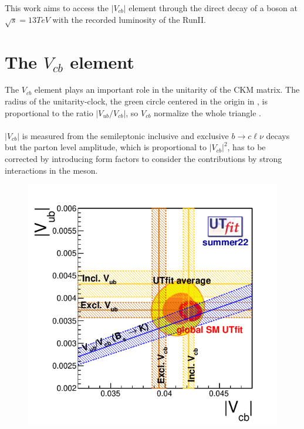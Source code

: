 \label{chap:vcb}
\vspace{-1cm}
\minitoc
This work aims to access the $|V_{cb}|$ element through the direct decay of a \PW boson at $\sqrt{s}=13 TeV$ with the recorded luminosity of the RunII.
\vspace{-0.25cm}
\section{The $V_{cb}$ element}\label{sec:vcb}
\begin{minipage}{\linewidth}
    \begin{minipage}{0.43\linewidth}
    \vspace{-0.3cm}
        The $V_{cb}$ element plays an important role in the unitarity of the CKM matrix. The radius of the unitarity-clock, the green circle centered in the origin in , is proportional to the ratio $|V_{ub}/V_{cb}|$, so $V_{cb}$ normalize the whole triangle \cite{Ricciardi2019DeterminationV_cb}.\\
        \\
        $|V_{cb}|$ is measured from the semileptonic inclusive and exclusive $b \to c\ell\nu$
        decays but the parton level amplitude, which is proportional to $|V_{cb}|^2$, has to be corrected by introducing form factors to consider the contributions by strong interactions in the meson. 
    \end{minipage}
    \hfill
    \begin{minipage}{0.55\linewidth}
        \vspace{-2.175cm}
        \begin{figure}[H]
            \centering
            \includegraphics[width=\linewidth]{fig//chap02-theory/vubvcb.png}

\end{figure}
\end{minipage}
\end{minipage}
